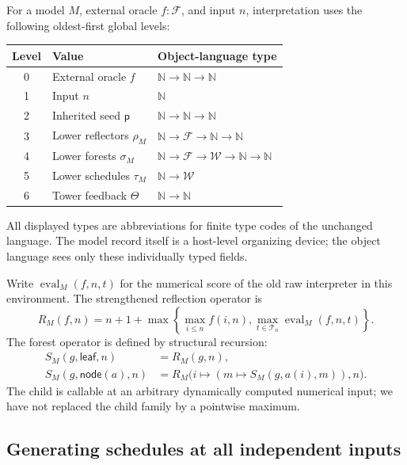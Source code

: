 \documentclass[11pt,letterpaper]{article}
\theoremstyle{definition}
\newcommand{\N}{\mathbb N}
\newcommand{\W}{\mathcal W}
\newcommand{\Fam}{\mathcal F}
\newcommand{\Eval}{\operatorname{eval}}
\newcommand{\ps}{\mathsf p}
\begin{document}
For a model $M$, external oracle $f:\Fam$, and input $n$, interpretation uses
the following oldest-first global levels:
\begin{center}
\begin{tabular}{@{}cll@{}}
\toprule
Level & Value & Object-language type\\
\midrule
0 & External oracle $f$ & $\N\to\N\to\N$\\
1 & Input $n$ & $\N$\\
2 & Inherited seed $\ps$ & $\N\to\N\to\N$\\
3 & Lower reflectors $\rho_M$ & $\N\to\Fam\to\N\to\N$\\
4 & Lower forests $\sigma_M$ & $\N\to\Fam\to\W\to\N\to\N$\\
5 & Lower schedules $\tau_M$ & $\N\to\W$\\
6 & Tower feedback $\Theta$ & $\N\to\N$\\
\bottomrule
\end{tabular}
\end{center}
All displayed types are abbreviations for finite type codes of the unchanged
language. The model record itself is a host-level organizing device; the
object language sees only these individually typed fields.

Write $\Eval_M(f,n,t)$ for the numerical score of the old raw interpreter
in this environment. The strengthened reflection operator is
\begin{equation}\label{eq:R}
 R_M(f,n)=n+1+
 \max\left\{\max_{i\le n} f(i,n),
              \max_{t\in\mathcal T_n}\Eval_M(f,n,t)\right\}.
\end{equation}
The forest operator is defined by structural recursion:
\begin{equation}\label{eq:S}
 \begin{split}
 S_M(g,\mathsf{leaf},n)&=R_M(g,n),\\
 S_M(g,\mathsf{node}(a),n)&=
       R_M\bigl(i\mapsto (m\mapsto S_M(g,a(i),m)),n\bigr).
 \end{split}
\end{equation}
The child is callable at an arbitrary dynamically computed numerical input;
we have not replaced the child family by a pointwise maximum.

\subsection{Generating schedules at all independent inputs}
\end{document}
